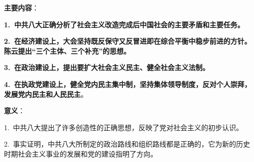 {\textbf{主要内容}：\textbf{}}

{\textbf{1.~中共八大正确分析了社会主义改造完成后中国社会的主要矛盾和主要任务。\\
}}

{\textbf{2.~在经济建设上，大会坚持既反保守又反冒进即在综合平衡中稳步前进的方针。陈云提出``三个主体、三个补充''的思想。}}

{\textbf{3.~在政治建设上，提出要扩大社会主义民主、健全社会主义法制。\\
}}

{\textbf{4.~在执政党建设上，健全党内民主集中制，坚持集体领导制度，反对个人崇拜，发展党内民主和人民民主}。}

{\textbf{{意义}}{：}}

{1.~{中共八大提出了许多创造性的正确思想，反映了党对社会主义的初步认识。}}

{2.~{事实证明，中共八大所制定的政治路线和组织路线都是正确的，它为新的历史时期社会主义事业的发展和党的建设指明了方向。}}
